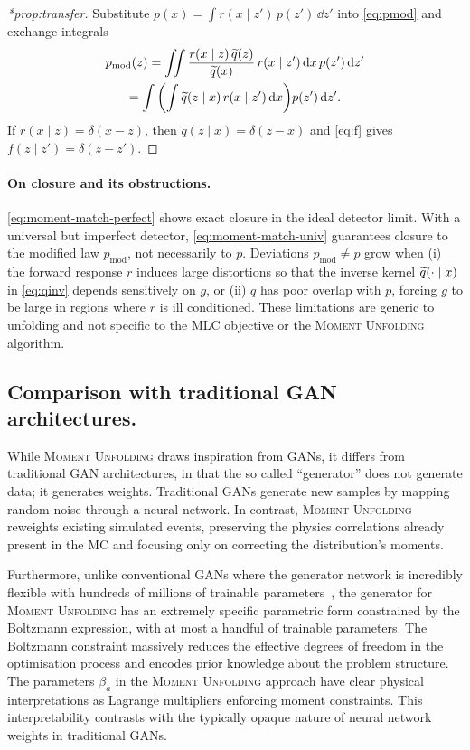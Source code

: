 \begin{proof}[*prop:transfer]
Substitute $p(x)=\int r(x\mid z')\,p(z')\,\dd z'$ into \cref{eq:pmod} and exchange integrals
\begin{gather}
p_{\mathrm{mod}}(z) = \iint \frac{r(x\mid z)\,\widetilde{q}(z)}{\widetilde{q}(x)}\,r(x\mid z')\,\dd x\,p(z')\,\dd z'\\
=\int \qty(\int \widetilde{q}(z\mid x)\,r(x\mid z')\,\dd x) p(z')\,\dd z'.
\end{gather}
If $r(x\mid z)=\delta(x-z)$, then $\tilde q(z\mid x)=\delta(z-x)$ and \cref{eq:f} gives $f(z\mid z')=\delta(z-z')$.
\end{proof}

\paragraph{On closure and its obstructions.}
\cref{eq:moment-match-perfect} shows exact closure in the ideal detector limit.
%
With a universal but imperfect detector, \cref{eq:moment-match-univ} guarantees closure to the modified law $p_{\mathrm{mod}}$, not necessarily to $p$. Deviations $p_{\mathrm{mod}}\neq p$ grow when (i) the forward response $r$ induces large distortions so that the inverse kernel $\widetilde{q}(\cdot\mid x)$ in \cref{eq:qinv} depends sensitively on $g$, or (ii) $q$ has poor overlap with $p$, forcing $g$ to be large in regions where $r$ is ill conditioned.
%
These limitations are generic to unfolding and not specific to the MLC objective or the \textsc{Moment Unfolding} algorithm.

    \subsection{Comparison with traditional GAN architectures.}
        While \textsc{Moment Unfolding} draws inspiration from GANs, it differs from traditional GAN architectures, in that the so called ``generator'' does not generate data; it generates weights.
        Traditional GANs generate new samples by mapping random noise through a neural network.
        In contrast, \textsc{Moment Unfolding} reweights existing simulated events, preserving the physics correlations already present in the MC and focusing only on correcting the distribution's moments.
    
        Furthermore, unlike conventional GANs where the generator network is incredibly flexible with hundreds of millions of trainable parameters~\cite{brock_large_2019, karras_analyzing_2020, Lee2022BigVGAN:Training}, the generator for \textsc{Moment Unfolding} has an extremely specific parametric form constrained by the Boltzmann expression, with at most a handful of trainable parameters.
        The Boltzmann constraint massively reduces the effective degrees of freedom in the optimisation process and encodes prior knowledge about the problem structure.
        The parameters $\beta_a$ in the \textsc{Moment Unfolding} approach have clear physical interpretations as Lagrange multipliers enforcing moment constraints.
        This interpretability contrasts with the typically opaque nature of neural network weights in traditional GANs.
    
